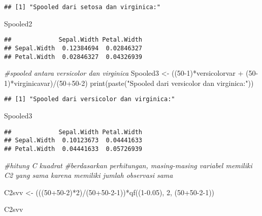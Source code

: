 \documentclass[
]{article}
\newenvironment{Shaded}{\begin{snugshade}}{\end{snugshade}}
\newcommand{\CommentTok}[1]{\textcolor[rgb]{0.56,0.35,0.01}{\textit{#1}}}
\newcommand{\DecValTok}[1]{\textcolor[rgb]{0.00,0.00,0.81}{#1}}
\newcommand{\FloatTok}[1]{\textcolor[rgb]{0.00,0.00,0.81}{#1}}
\newcommand{\FunctionTok}[1]{\textcolor[rgb]{0.00,0.00,0.00}{#1}}
\newcommand{\NormalTok}[1]{#1}
\newcommand{\OtherTok}[1]{\textcolor[rgb]{0.56,0.35,0.01}{#1}}
\newcommand{\SpecialCharTok}[1]{\textcolor[rgb]{0.00,0.00,0.00}{#1}}
\newcommand{\StringTok}[1]{\textcolor[rgb]{0.31,0.60,0.02}{#1}}
\begin{document}
\begin{verbatim}
## [1] "Spooled dari setosa dan virginica:"
\end{verbatim}

\begin{Shaded}
\begin{Highlighting}[]
\NormalTok{Spooled2}
\end{Highlighting}
\end{Shaded}

\begin{verbatim}
##             Sepal.Width Petal.Width
## Sepal.Width  0.12384694  0.02846327
## Petal.Width  0.02846327  0.04326939
\end{verbatim}

\begin{Shaded}
\begin{Highlighting}[]
\CommentTok{\#spooled antara versicolor dan virginica}
\NormalTok{Spooled3 }\OtherTok{\textless{}{-}}\NormalTok{ ((}\DecValTok{50{-}1}\NormalTok{)}\SpecialCharTok{*}\NormalTok{versicolorvar }\SpecialCharTok{+}\NormalTok{ (}\DecValTok{50{-}1}\NormalTok{)}\SpecialCharTok{*}\NormalTok{virginicavar)}\SpecialCharTok{/}\NormalTok{(}\DecValTok{50}\SpecialCharTok{+}\DecValTok{50{-}2}\NormalTok{)}
\FunctionTok{print}\NormalTok{(}\FunctionTok{paste}\NormalTok{(}\StringTok{"Spooled dari versicolor dan virginica:"}\NormalTok{))}
\end{Highlighting}
\end{Shaded}

\begin{verbatim}
## [1] "Spooled dari versicolor dan virginica:"
\end{verbatim}

\begin{Shaded}
\begin{Highlighting}[]
\NormalTok{Spooled3}
\end{Highlighting}
\end{Shaded}

\begin{verbatim}
##             Sepal.Width Petal.Width
## Sepal.Width  0.10123673  0.04441633
## Petal.Width  0.04441633  0.05726939
\end{verbatim}

\begin{Shaded}
\begin{Highlighting}[]
\CommentTok{\#hitung C kuadrat}
\CommentTok{\#berdasarkan perhitungan, masing{-}masing variabel memiliki C2 yang sama karena memiliki jumlah observasi sama}

\NormalTok{C2svv }\OtherTok{\textless{}{-}}\NormalTok{ (((}\DecValTok{50}\SpecialCharTok{+}\DecValTok{50{-}2}\NormalTok{)}\SpecialCharTok{*}\DecValTok{2}\NormalTok{)}\SpecialCharTok{/}\NormalTok{(}\DecValTok{50}\SpecialCharTok{+}\DecValTok{50{-}2{-}1}\NormalTok{))}\SpecialCharTok{*}\FunctionTok{qf}\NormalTok{((}\DecValTok{1}\FloatTok{{-}0.05}\NormalTok{), }\DecValTok{2}\NormalTok{, (}\DecValTok{50}\SpecialCharTok{+}\DecValTok{50{-}2{-}1}\NormalTok{))}

\NormalTok{C2svv}
\end{Highlighting}
\end{Shaded}
\end{document}
